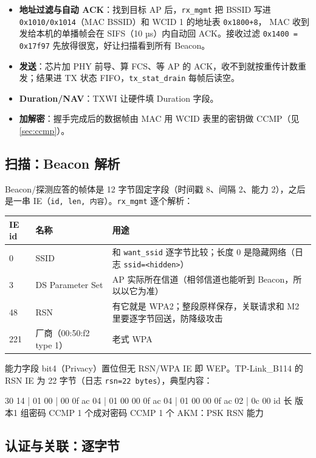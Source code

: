 \documentclass[UTF8,zihao=-4,fontset=none]{ctexart}
\newcommand{\fn}[1]{\texttt{#1}}
\begin{document}
\begin{itemize}[leftmargin=2em,itemsep=0pt]
\item \textbf{地址过滤与自动 ACK}：找到目标 AP 后，\fn{rx\_mgmt} 把 BSSID 写进 \fn{0x1010/0x1014}（MAC BSSID）和 WCID 1 的地址表 \fn{0x1800+8}，
  MAC 收到发给本机的单播帧会在 SIFS（10 µs）内自动回 ACK。接收过滤 \fn{0x1400 = 0x17f97} 先放得很宽，好让扫描看到所有 Beacon。
\item \textbf{发送}：芯片加 PHY 前导、算 FCS、等 AP 的 ACK，收不到就按重传计数重发；结果进 TX 状态 FIFO，\fn{tx\_stat\_drain} 每帧后读空。
\item \textbf{Duration/NAV}：TXWI 让硬件填 Duration 字段。
\item \textbf{加解密}：握手完成后的数据帧由 MAC 用 WCID 表里的密钥做 CCMP（见 \ref{sec:ccmp}）。
\end{itemize}

\subsection{扫描：Beacon 解析}

Beacon/探测应答的帧体是 12 字节固定字段（时间戳 8、间隔 2、能力 2），之后是一串 IE（\fn{id, len, 内容}）。\fn{rx\_mgmt} 逐个解析：

\begin{longtable}{p{14mm}p{30mm}p{104mm}}
\toprule
IE id & 名称 & 用途 \\ \midrule \endhead
0 & SSID & 和 \fn{want\_ssid} 逐字节比较；长度 0 是隐藏网络（日志 \fn{ssid=<hidden>}） \\
3 & DS Parameter Set & AP 实际所在信道（相邻信道也能听到 Beacon，所以以它为准） \\
48 & RSN & 有它就是 WPA2；整段原样保存，关联请求和 M2 里要逐字节回送，防降级攻击 \\
221 & 厂商（00:50:f2 type 1） & 老式 WPA \\
\bottomrule
\end{longtable}

能力字段 bit4（Privacy）置位但无 RSN/WPA IE 即 WEP。TP-Link\_B114 的 RSN IE 为 22 字节（日志 \fn{rsn=22 bytes}），典型内容：
\begin{code}
30 14 | 01 00 | 00 0f ac 04 | 01 00 00 0f ac 04 | 01 00 00 0f ac 02 | 0c 00
 id 长   版本1    组密码 CCMP    1 个成对密码 CCMP     1 个 AKM：PSK      RSN 能力
\end{code}

\subsection{认证与关联：逐字节}
\end{document}
